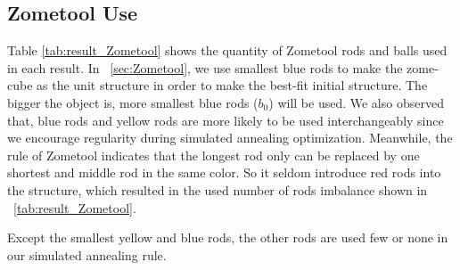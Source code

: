 \subsection{Zometool Use}
Table \ref{tab:result_Zometool} shows the quantity of Zometool rods and balls used in each result. 
In \secname~\ref{sec:Zometool}, we use smallest blue rods to make the zome-cube as the unit structure in order to make the best-fit initial structure. 
The bigger the object is, more smallest blue rods (${b_0}$) will be used.
We also observed that, blue rods and yellow rods are more likely to be used interchangeably since we encourage regularity during  simulated annealing optimization. 
Meanwhile, the rule of Zometool indicates that the longest rod only can be replaced by one shortest and middle rod in the same color.
So it seldom introduce red rods into the structure, which resulted in the used number of rods imbalance shown in \tabname~\ref{tab:result_Zometool}.

Except the smallest yellow and blue rods, the other rods are used few or none in our simulated annealing rule.

